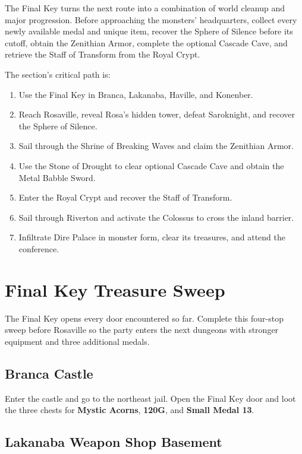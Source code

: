 \documentclass[
  american,
  10pt,
  letterpaper,
  oneside,
  open=any]{scrreprt}
\providecommand{\tightlist}{%
  \setlength{\itemsep}{0pt}\setlength{\parskip}{0pt}}
\begin{document}
The Final Key turns the next route into a combination of world cleanup
and major progression. Before approaching the monsters' headquarters,
collect every newly available medal and unique item, recover the Sphere
of Silence before its cutoff, obtain the Zenithian Armor, complete the
optional Cascade Cave, and retrieve the Staff of Transform from the
Royal Crypt.

The section's critical path is:

\begin{enumerate}
\def\labelenumi{\arabic{enumi}.}
\tightlist
\item
  Use the Final Key in Branca, Lakanaba, Haville, and Konenber.
\item
  Reach Rosaville, reveal Rosa's hidden tower, defeat Saroknight, and
  recover the Sphere of Silence.
\item
  Sail through the Shrine of Breaking Waves and claim the Zenithian
  Armor.
\item
  Use the Stone of Drought to clear optional Cascade Cave and obtain the
  Metal Babble Sword.
\item
  Enter the Royal Crypt and recover the Staff of Transform.
\item
  Sail through Riverton and activate the Colossus to cross the inland
  barrier.
\item
  Infiltrate Dire Palace in monster form, clear its treasures, and
  attend the conference.
\end{enumerate}

\section{Final Key Treasure Sweep}\label{final-key-treasure-sweep}

The Final Key opens every door encountered so far. Complete this
four-stop sweep before Rosaville so the party enters the next dungeons
with stronger equipment and three additional medals.

\subsection{Branca Castle}\label{branca-castle}

Enter the castle and go to the northeast jail. Open the Final Key door
and loot the three chests for \textbf{Mystic Acorns}, \textbf{120G}, and
\textbf{Small Medal 13}.

\subsection{Lakanaba Weapon Shop
Basement}\label{lakanaba-weapon-shop-basement}
\end{document}
